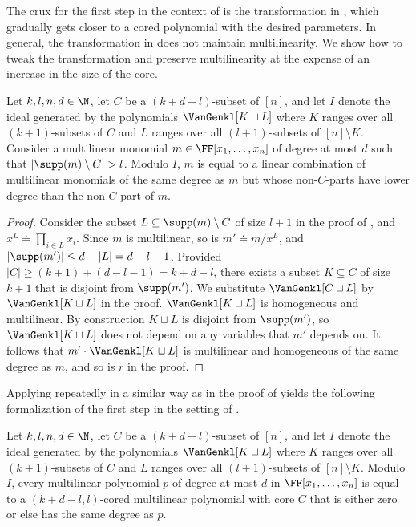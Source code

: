 \documentclass{toc}
\begin{document}
The crux for the first step in the context of  is the transformation in , which gradually gets closer to a cored polynomial with the desired parameters. In general, the transformation in  does not maintain multilinearity. We show how to tweak the transformation and preserve multilinearity at the expense of an increase in the size of the core.

\begin{proposition}
\label{prop.membership-coredform}
Let \(k,l,n,d \in\N\), let \(C\) be a \((k+d-l)\)-subset of \([n]\), and let $I$ denote the ideal generated by the polynomials $\VanGenkl[K \sqcup L]$ where $K$ ranges over all $(k+1)$-subsets of $C$ and $L$ ranges over all $(l+1)$-subsets of $[n] \setminus K$. Consider a multilinear monomial $m \in \FF[x_1,\dots,x_n]$ of degree at most $d$ such that $|\supp(m) \setminus C| > l$. Modulo $I$, $m$ is equal to a linear combination of multilinear monomials of the same degree as $m$ but whose non-$C$-parts have lower degree than the non-$C$-part of $m$.
\end{proposition}
\begin{proof}
Consider the subset $L \subseteq \supp(m) \setminus C$ of size $l+1$ in the proof of , and $x^L \doteq \prod_{i \in L} x_i$. Since $m$ is multilinear, so is $m' \doteq m/x^L$, and $|\supp(m')| \le d-|L| = d-l-1$. Provided $|C| \ge (k+1) + (d-l-1) = k+d-l$, there exists a subset $K \subseteq C$ of size $k+1$ that is disjoint from $\supp(m')$. We substitute $\VanGenkl[C \sqcup L]$ by $\VanGenkl[K \sqcup L]$ in the proof. $\VanGenkl[K \sqcup L]$ is homogeneous and multilinear. By construction $K \sqcup L$ is disjoint from $\supp(m')$, so $\VanGenkl[K \sqcup L]$ does not depend on any variables that $m'$ depends on. It follows that $m' \cdot \VanGenkl[K \sqcup L]$ is multilinear and homogeneous of the same degree as $m$, and so is $r$ in the proof.
\end{proof}

Applying  repeatedly in a similar way as  in the proof of  yields the following formalization of the first step in the setting of .
\begin{lemma}
  \label{lem.membership-coredform}
  Let \(k,l,n,d \in\N\), let \(C\) be a \((k+d-l)\)-subset of \([n]\), and let $I$ denote the ideal generated by the polynomials $\VanGenkl[K \sqcup L]$ where $K$ ranges over all $(k+1)$-subsets of $C$ and $L$ ranges over all $(l+1)$-subsets of $[n] \setminus K$.
  Modulo $I$,
  every multilinear polynomial $p $ of degree at most $d$ in $\FF[x_1,\dots,x_n]$ is equal to a \((k+d-l,l)\)-cored multilinear polynomial with core \(C\) that is either zero or else has the same degree as $p$.
\end{lemma}
\end{document}
